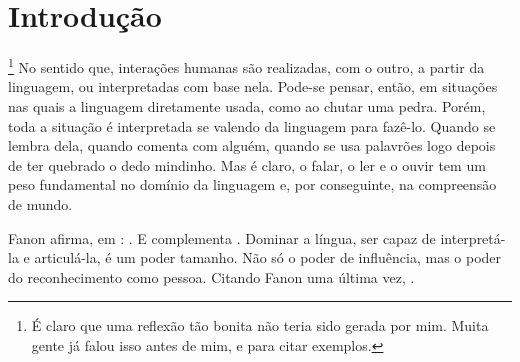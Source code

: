 \chapter{Introdução}
\label{cha:introducao}
 \cite{oliveira2019servico}
\footnote{É claro que uma reflexão tão bonita não teria sido gerada por mim. Muita gente já falou isso antes de mim,  e  para citar exemplos.}
No sentido que, interações humanas são realizadas, com o outro, a partir da linguagem, ou interpretadas com base nela. 
Pode-se pensar, então, em situações nas quais a linguagem  diretamente usada, como ao chutar uma pedra.
Porém, toda a situação é interpretada se valendo da linguagem para fazê-lo. 
Quando se lembra dela, quando comenta com alguém, quando se  usa palavrões logo depois de ter quebrado o dedo mindinho. Mas é claro, o falar, o ler e o ouvir tem um peso fundamental no domínio da linguagem e, por conseguinte, na compreensão de mundo.

Fanon afirma, em : . E complementa  . Dominar a língua, ser capaz de interpretá-la e articulá-la, é um poder tamanho. Não só o poder de influência, mas o poder do reconhecimento como pessoa. Citando Fanon uma última vez,  .

